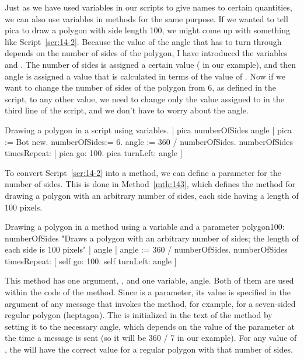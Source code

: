 \documentclass[a4paper,10pt,twoside]{book}
\begin{document}
Just as we have used variables in our scripts to give names to certain quantities, we can also 
use variables in methods for the same purpose. If we wanted to tell pica to draw a polygon 
with side length 100, we might come up with something like Script~\ref{scr:14-2}. Because the value of 
the angle that  has to turn through depends on the number of sides of the polygon, I have 
introduced the variables  and . The number of sides is assigned a certain 
value ( in our example), and then angle is assigned a value that is calculated 
in terms of the value of . Now if we want to change the number of sides of the 
polygon from 6, as defined in the script, to any other value, we need to change only the value 
assigned to  in the third line of the script, and we don’t have to worry about the 
angle. 

\begin{script}[14-2]{Drawing a polygon in a script using variables. }
| pica numberOfSides angle | 
pica := Bot new. 
numberOfSides:= 6. 
angle := 360 / numberOfSides. 
numberOfSides timesRepeat: 
    [ pica go: 100. 
    pica turnLeft: angle ] 
\end{script}


To convert Script~\ref{scr:14-2} into a method, we can define a parameter for the number of sides. 
This is done in Method~\ref{mth:143}, which defines the method  for drawing a polygon 
with an arbitrary number of sides, each side having a length of 100 pixels. 

\begin{method}[143]{Drawing a polygon in a method using a variable and a parameter }
polygon100: numberOfSides 
"Draws a polygon with an arbitrary number of sides; 
the length of each side is 100 pixels" 
   | angle | 
   angle := 360 / numberOfSides. 
   numberOfSides timesRepeat: 
       [ self go: 100. 
       self turnLeft: angle ]
\end{method}



This method has one argument, , and one variable, angle. Both of them are 
used within the code of the method. Since  is a parameter, its value is specified 
in the argument of any message that invokes the method, for example,  
for a seven-sided regular polygon (heptagon). The  is initialized in the text of the 
method by setting it to the necessary angle, which depends on the value of the parameter at the 
time a message is sent (so it will be 360 / 7 in our example). For any value of , the 
 will have the correct value for a regular polygon with that number of sides. 
\end{document}
